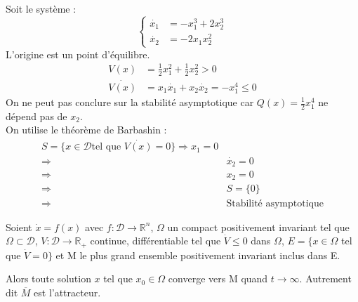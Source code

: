 \documentclass[main.tex]{subfiles} \newcommand{\D}{\mathcal{D}}
\begin{document}
\begin{exemple} Soit le système : \[ \begin{cases} \dot{x_1} &= -x_1^3 + 2
x_2^3\\\dot{x_2} &= -2x_1x_2^2 \end{cases} \] L'origine est un point
d'équilibre.\\ \begin{align*} V(x) &= \frac{1}{2}x_1^2 + \frac{1}{2}x_2^2 >0\\
	\dot{V(x)} &= x_1\dot{x_1} + x_2\dot{x_2} = -x_1^4 \leq 0 \end{align*} On
	ne peut pas conclure sur la stabilité asymptotique car $Q(x) =
	\frac{1}{2}x_1^4$ ne dépend pas de $x_2$. \\

  On utilise le théorème de Barbashin : \begin{align*} S = \{x \in \D \text{
		  tel que }\dot{V(x)} = 0\} \Rightarrow x_1 = 0\\ \Rightarrow &
	  \dot{x_2} = 0\\ \Rightarrow & x_2 = 0\\ \Rightarrow & S = \{0\}\\
	  \Rightarrow & \text{Stabilité asymptotique} \end{align*} \end{exemple}

\begin{thm} Soient $ \dot{x} = f(x)$ avec $f:
	\D \rightarrow \mathbb{R}^n$, $\Omega$ un compact positivement invariant
	tel que $\Omega \subset \D$, $V:\D\rightarrow\mathbb{R}_+$ continue,
	différentiable tel que $\dot{V} \leq 0 $ dans $\Omega$, $E= \{x \in \Omega$
	tel que $ \dot{V}=0\}$ et M le plus grand ensemble positivement invariant
	inclus dans E.

  Alors toute solution $x$ tel que $x_0 \in \Omega$ converge vers M quand $t
\longrightarrow \infty$. Autrement dit $\overline{M}$ est l'attracteur.
\end{thm}
\end{document}
